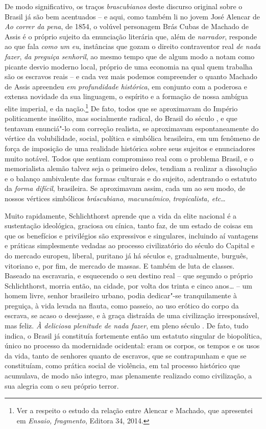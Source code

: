 De modo significativo, os traços \emph{brascubianos} deste discurso
original sobre o Brasil já são bem acentuados -- e aqui, como também li
no jovem José Alencar de \emph{Ao correr da pena}, de 1854, o volúvel
personagem Brás Cubas de Machado de Assis é o próprio sujeito da
enunciação literária que, além de \emph{narrador}, responde ao que fala
\emph{como um} \emph{eu}, instâncias que gozam o direito contraventor
real \emph{de nada fazer}, \emph{da preguiça senhoril}, ao mesmo tempo
que de algum modo a notam como picante desvio moderno local, próprio de
uma economia na qual quem trabalha são os escravos reais -- e cada vez
mais podemos compreender o quanto Machado de Assis apreendeu \emph{em
profundidade histórica}, em conjunto com a poderosa e extensa novidade
da sua linguagem, o espírito e a formação de nossa ambígua elite
imperial, e da nação.\footnote{Ver a respeito o estudo da relação entre
  Alencar e Machado, que apresentei em \emph{Ensaio, fragmento}, Editora
  34, 2014.} De fato, todos que se aproximavam do Império politicamente
insólito, mas socialmente radical, do Brasil do século , e que
tentavam enunciá"-lo com correção realista, se aproximavam
espontaneamente do vértice da volubilidade, social, política e simbólica
brasileira, em um fenômeno de força de imposição de uma realidade
histórica sobre seus sujeitos e enunciadores muito notável. Todos que
sentiam compromisso real com o problema Brasil, e o memorialista alemão
talvez seja o primeiro deles, tendiam a realizar a dissolução e o
balanço ambivalente das formas culturais e do sujeito, adentrando o
estatuto da \emph{forma difícil}, brasileira. Se aproximavam assim, cada
um ao seu modo, de nossos vértices simbólicos \emph{bráscubiano},
\emph{macunaímico}, \emph{tropicalista, etc}\ldots{}

Muito rapidamente, Schlichthorst aprende que a vida da elite nacional é
a sustentação ideológica, graciosa ou cínica, tanto faz, de um estado de
coisas em que os benefícios e privilégios são expressivos e singulares,
incluindo aí vantagens e práticas simplesmente vedadas ao processo
civilizatório do século do Capital e do mercado europeu, liberal,
puritano já há séculos e, gradualmente, burguês, vitoriano e, por fim,
de mercado de massas. E também de luta de classes. Baseado na
escravaria, e esquecendo o seu destino real -- que segundo o próprio
Schlichthorst, morria então, na cidade, por volta dos trinta e cinco
anos\ldots{} -- um homem livre, senhor brasileiro urbano, podia dedicar"-se
tranquilamente à preguiça, à vida levada na flauta, como passeio, ao uso
erótico do corpo da escrava, se acaso o desejasse, e à graça distraída
de uma civilização irresponsável, mas feliz. \emph{À deliciosa plenitude
de nada fazer}, em pleno século . De fato, tudo indica, o Brasil já
constituía fortemente então um estatuto singular de biopolítica, único
no processo da modernidade ocidental: eram os corpos, os tempos e os
usos da vida, tanto de senhores quanto de escravos, que se contrapunham
e que se constituíam, como prática social de violência, em tal processo
histórico que acumulava, de modo não integro, mas plenamente realizado
como civilização, a sua alegria com o seu próprio terror.

